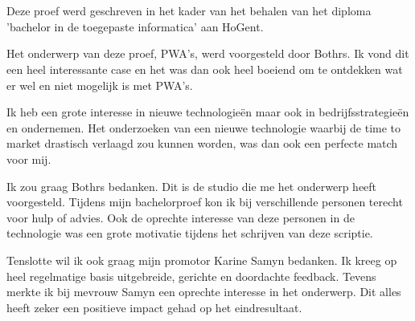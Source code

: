 
\chapter*{}
\label{ch:voorwoord}


Deze proef werd geschreven in het kader van het behalen van het diploma 'bachelor in de toegepaste informatica' aan HoGent.

Het onderwerp van deze proef, PWA's, werd voorgesteld door Bothrs. Ik vond dit een heel interessante case en het was dan ook heel boeiend om te ontdekken wat er wel en niet mogelijk is met PWA's.

Ik heb een grote interesse in nieuwe technologieën maar ook in bedrijfsstrategieën en ondernemen. Het onderzoeken van een nieuwe technologie waarbij de time to market drastisch verlaagd zou kunnen worden, was dan ook een perfecte match voor mij. 

Ik zou graag Bothrs bedanken. Dit is de studio die me het onderwerp heeft voorgesteld. 
Tijdens mijn bachelorproef kon ik bij verschillende personen terecht voor hulp of advies. Ook de oprechte interesse van deze personen in de technologie was een grote motivatie tijdens het schrijven van deze scriptie.

Tenslotte wil ik ook graag mijn promotor Karine Samyn bedanken. Ik kreeg op heel regelmatige basis uitgebreide, gerichte en doordachte feedback. Tevens merkte ik bij mevrouw Samyn een oprechte interesse in het onderwerp. Dit alles heeft zeker een positieve impact gehad op het eindresultaat.